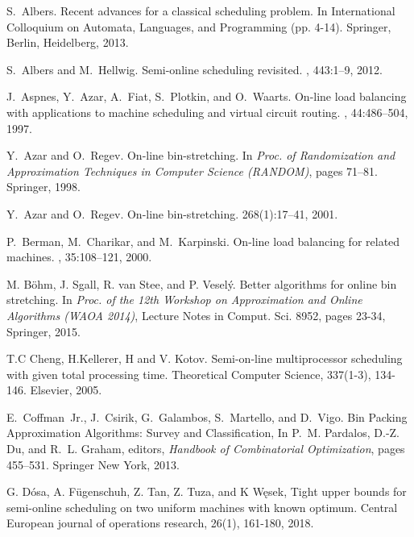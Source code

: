 \begin{thebibliography}{99}
\setlength\itemsep{0pt}

S.~Albers.
\newblock Recent advances for a classical scheduling problem.
\newblock In International Colloquium on Automata, Languages, and Programming (pp. 4-14). Springer, Berlin, Heidelberg, 2013.

S.~Albers and M.~Hellwig.
\newblock Semi-online scheduling revisited.
, 443:1--9, 2012.

J.~Aspnes, Y.~Azar, A.~Fiat, S.~Plotkin, and O.~Waarts.
\newblock On-line load balancing with applications to machine scheduling and
  virtual circuit routing.
, 44:486--504, 1997.

Y.~Azar and O.~Regev.
\newblock On-line bin-stretching.
\newblock In {\em Proc. of Randomization and Approximation Techniques in Computer
  Science (RANDOM)}, pages 71--81. Springer, 1998. 

Y.~Azar and O.~Regev.
\newblock On-line bin-stretching.
 268(1):17--41, 2001. 

P.~Berman, M.~Charikar, and M.~Karpinski.
\newblock On-line load balancing for related machines.
, 35:108--121, 2000.

M. B\"ohm, J. Sgall, R. van Stee, and P. Vesel\'y. 
\newblock Better algorithms for online bin stretching.
\newblock 
In {\em Proc. of the 12th Workshop on Approximation and Online Algorithms (WAOA 2014)}, Lecture Notes in Comput. Sci. 8952, pages 23-34, Springer, 2015.

T.C Cheng, H.Kellerer, H and V. Kotov.
\newblock Semi-on-line multiprocessor scheduling with given total processing time.
\newblock Theoretical Computer Science, 337(1-3), 134-146. Elsevier,
2005.

E.~Coffman~Jr., J.~Csirik, G.~Galambos, S.~Martello, and D.~Vigo.
\newblock Bin Packing Approximation Algorithms: Survey and Classification,
\newblock In P.~M. Pardalos, D.-Z. Du, and R.~L. Graham, editors, {\em Handbook
of Combinatorial Optimization}, pages 455--531. Springer New York,
2013.

G. Dósa, A. Fügenschuh, Z. Tan, Z. Tuza, and K Węsek,
\newblock Tight upper bounds for semi-online scheduling on two uniform machines with known optimum.
\newblock Central European journal of operations research, 26(1), 161-180, 2018.


\end{thebibliography}
